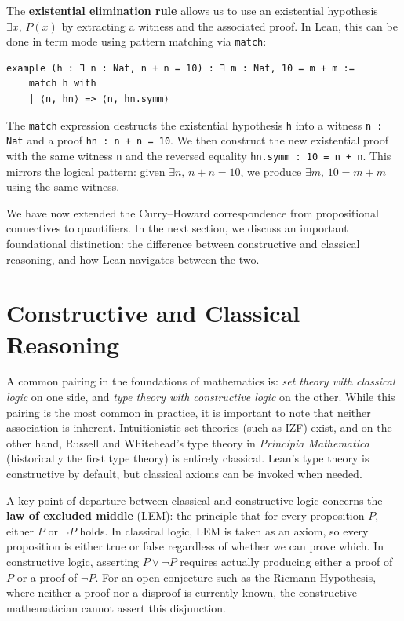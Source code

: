 \begin{example}
  The \textbf{existential elimination rule} allows us to use an
  existential hypothesis $\exists x,\, P(x)$ by extracting a witness
  and the associated proof.
  In Lean, this can be done in term mode using pattern matching
  via \lstinline[language=lean]|match|:
  \begin{lstlisting}[language=lean]
  example (h : ∃ n : Nat, n + n = 10) : ∃ m : Nat, 10 = m + m :=
    match h with
    | ⟨n, hn⟩ => ⟨n, hn.symm⟩
  \end{lstlisting}
  The \lstinline[language=lean]|match| expression destructs the
  existential hypothesis \lstinline[language=lean]|h| into a witness
  \lstinline[language=lean]|n : Nat| and a proof
  \lstinline[language=lean]|hn : n + n = 10|.
  We then construct the new existential proof with the same witness
  \lstinline[language=lean]|n| and the reversed equality
  \lstinline[language=lean]|hn.symm : 10 = n + n|.
  This mirrors the logical pattern: given
  $\exists n,\, n + n = 10$, we produce $\exists m,\, 10 = m + m$
  using the same witness.
\end{example}

We have now extended the Curry--Howard correspondence from
propositional connectives to quantifiers.
In the next section, we discuss an important foundational
distinction: the difference between constructive and classical
reasoning, and how Lean navigates between the two.

\section{Constructive and Classical Reasoning}\label{sec:constructive}

A common pairing in the foundations of mathematics is:
\emph{set theory with classical logic} on one side, and
\emph{type theory with constructive logic} on the other.
While this pairing is the most common in practice, it is important to
note that neither association is inherent.
Intuitionistic set theories (such as IZF) exist, and on the other
hand, Russell and Whitehead's type theory in
\emph{Principia Mathematica} (historically the first type
theory) is entirely classical.
Lean's type theory is constructive by default, but classical axioms
can be invoked when needed.

A key point of departure between classical and constructive logic
concerns the \textbf{law of excluded middle} (LEM): the principle
that for every proposition $P$, either $P$ or $\lnot P$ holds.
In classical logic, LEM is taken as an axiom, so every proposition is
either true or false regardless of whether we can prove which.
In constructive logic, asserting $P \lor \lnot P$ requires actually
producing either a proof of $P$ or a proof of $\lnot P$.
For an open conjecture such as the Riemann Hypothesis, where neither
a proof nor a disproof is currently known, the constructive
mathematician cannot assert this disjunction.

